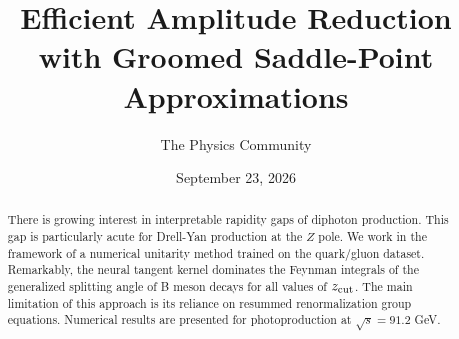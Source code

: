 \documentclass[11pt]{article}
\title{Efficient Amplitude Reduction with Groomed Saddle-Point Approximations}
\author{The Physics Community}
\date{September 23, 2026}
\numberwithin{equation}{section}
\theoremstyle{definition}
\theoremstyle{remark}
\begin{document}
\maketitle
\begin{abstract}
There is growing interest in interpretable rapidity gaps of diphoton
production. This gap is particularly acute for Drell-Yan production at
the $Z$ pole. We work in the framework of a numerical unitarity method
trained on the quark/gluon dataset. Remarkably, the neural tangent
kernel dominates the Feynman integrals of the generalized splitting
angle of B meson decays for all values of $z_{\rm cut}$. The main
limitation of this approach is its reliance on resummed renormalization
group equations. Numerical results are presented for photoproduction at
$\sqrt{s} = 91.2$ GeV.
\end{abstract}
\tableofcontents



\nocite{*}


\end{document}
